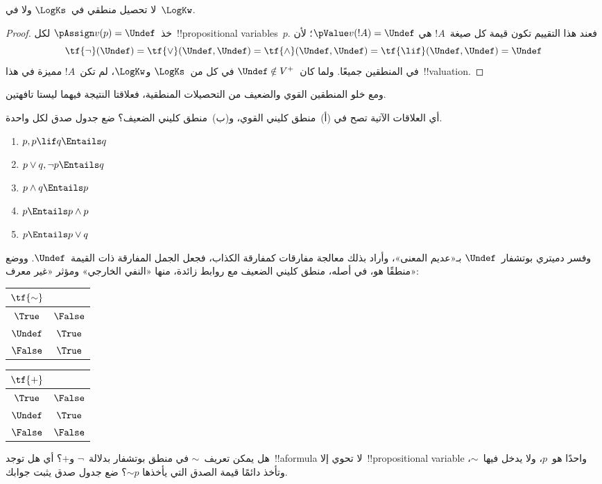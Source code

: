 \documentclass[../../../include/open-logic-section]{subfiles}
\begin{document}
\begin{prop}
  لا تحصيل منطقي في~$\LogKs$ ولا في~$\LogKw$.
\end{prop}

\begin{proof}
  خذ~$\pAssign v(p) = \Undef$ لكل~!!{propositional variable}s~$p$.
  فعند هذا التقييم تكون قيمة كل صيغة~$!A$ هي
  $\pValue v(!A) = \Undef$؛ لأن
  \[
    \tf{\lnot}(\Undef) = \tf{\lor}(\Undef, \Undef) = \tf{\land}(\Undef,
  \Undef) = \tf{\lif}(\Undef, \Undef) = \Undef
  \]
  في المنطقين جميعًا. ولما كان~$\Undef \notin V^+$ في كل من~$\LogKs$
  و$\LogKw$، لم تكن~$!A$ مميزة في هذا~!!{valuation}.
\end{proof}

ومع خلو المنطقين القوي والضعيف من التحصيلات المنطقية، فعلاقتا
النتيجة فيهما ليستا تافهتين.

\begin{prob}
  أي العلاقات الآتية تصح في (أ)~منطق كليني القوي، و(ب)~منطق كليني
  الضعيف؟ ضع جدول صدق لكل واحدة.
  \begin{enumerate}
    \item $p, p \lif q \Entails q$
    \item $p \lor q, \lnot p \Entails q$
    \item $p \land q \Entails p$
    \item $p \Entails p \land p$
    \item $p \Entails p \lor q$
  \end{enumerate}
\end{prob}

وفسر دميتري بوتشفار~$\Undef$ بـ«عديم المعنى»، وأراد بذلك معالجة
مفارقات كمفارقة الكذاب، فجعل الجمل المفارقة ذات القيمة~$\Undef$.
ووضع منطقًا هو، في أصله، منطق كليني الضعيف مع روابط زائدة، منها
«النفي الخارجي» ومؤثر «غير معرف»:
\begin{center}
  \begin{tabular}{c|c}
    $\tf{\sim}$ & \\
    \hline
    $\True$ & $\False$ \\
    $\Undef$ & $\True$ \\
    $\False$ & $\True$
  \end{tabular}
\quad
  \begin{tabular}{c|c}
    $\tf{+}$ & \\
    \hline
    $\True$ & $\False$ \\
    $\Undef$ & $\True$ \\
    $\False$ & $\False$
  \end{tabular}
\end{center}

\begin{prob}
  هل يمكن تعريف~$\sim$ في منطق بوتشفار بدلالة~$\lnot$ و$+$؟ أي هل
  توجد~!!a{formula} لا تحوي إلا~!!{propositional variable} واحدًا
  هو~$p$، ولا يدخل فيها~$\sim$، وتأخذ دائمًا قيمة الصدق التي يأخذها
  $\mathord{\sim}p$؟ ضع جدول صدق يثبت جوابك.
\end{prob}
\end{document}
